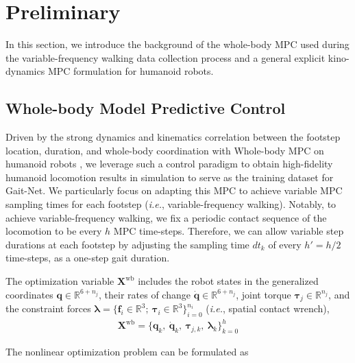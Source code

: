 \section{Preliminary}
\label{sec:bg}

In this section, we introduce the background of the whole-body MPC used during the variable-frequency walking data collection process and a general explicit kino-dynamics MPC formulation for humanoid robots.

\subsection{Whole-body Model Predictive Control}
\label{subsec:wbmpc}
Driven by the strong dynamics and kinematics correlation between the footstep location, duration, and whole-body coordination with Whole-body MPC on humanoid robots \cite{khazoom2024tailoring, dantec2024centroidal}, we leverage such a control paradigm to obtain high-fidelity humanoid locomotion results in simulation to serve as the training dataset for Gait-Net. We particularly focus on adapting this MPC to achieve variable MPC sampling times for each footstep (\textit{i.e.}, variable-frequency walking).
Notably, to achieve variable-frequency walking, we fix a periodic contact sequence of the locomotion to be every $h$ MPC time-steps. Therefore, we can allow variable step durations at each footstep by adjusting the sampling time $dt_k$ of every $h'=h/2$ time-steps, as a one-step gait duration. 


The optimization variable $\mathbf X^\text{wb}$ includes the robot states in the generalized coordinates $\mathbf q \in \mathbb R^{6+n_j}$, their rates of change $\dot{\mathbf q} \in \mathbb R^{6+n_j}$, joint torque $\bm \tau_j \in \mathbb R^{n_j}$, and the constraint forces $\bm \lambda = \{\bm f_i\in \mathbb R^{3};\: \bm \tau_i\in \mathbb R^{3}\}^{n_i}_{i=0} $ (\textit{i.e.}, spatial contact wrench), 
\begin{align}
    \mathbf X^\text{wb} = \{ \mathbf q_k,\: \dot{\mathbf q}_k,\: \bm \tau_{j,k},\: \bm \lambda_k \}^{h}_{k=0}
\end{align}

The nonlinear optimization problem can be formulated as


